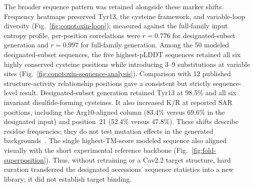 The broader sequence pattern was retained alongside these marker shifts. Frequency heatmaps
preserved Tyr13, the cysteine framework, and variable-loop diversity
(Fig.~\ref{fig:conotoxin-loop}); measured against the full-family input entropy profile,
per-position correlations were $r=0.776$ for designated-subset generation and $r=0.997$ for
full-family generation. Among the 50 modeled designated-subset sequences, the five
highest-pLDDT sequences retained all six highly conserved cysteine positions while introducing
3--9 substitutions at variable sites (Fig.~\ref{fig:conotoxin-sequence-analysis}).
Comparison with 12 published structure-activity relationship positions gave a consistent but
strictly sequence-level result. Designated-subset generation retained Tyr13 at 98.5\% and all
six invariant disulfide-forming cysteines. It also increased K/R at reported SAR
positions, including the Arg10-aligned column (83.4\% versus 69.6\% in the designated input) and
position~21 (52.4\% versus 47.8\%). These shifts describe residue frequencies; they do not test
mutation effects in the generated backgrounds~\cite{kimTyr13Essential1995,satoBasicResidues1993,lewisConotoxinSAR2012}.
The single highest-TM-score modeled sequence also aligned visually with the short experimental
reference backbone (Fig.~\ref{fig:fold-superposition}). Thus, without
retraining or a Cav2.2 target structure, hard curation transferred the designated accessions'
sequence statistics into a new library; it did not establish target binding.

\DisplayConotoxin

